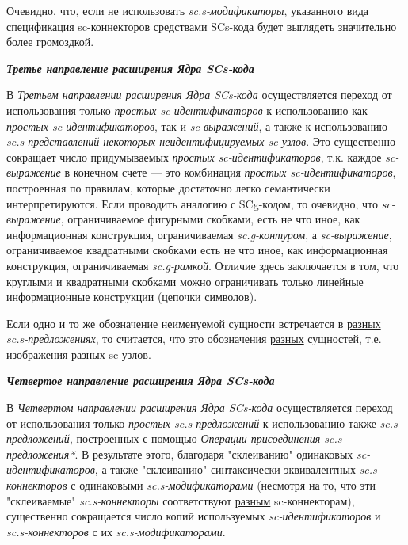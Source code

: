 Очевидно, что, если не использовать \textit{sc.s-модификаторы}, указанного вида спецификация sc-коннекторов средствами SCs-кода будет выглядеть значительно более громоздкой.

\textbf{\textit{Третье направление расширения Ядра SCs-кода}}

В \textit{Третьем направлении расширения Ядра SCs-кода} осуществляется переход от использования только \textit{простых sc-идентификаторов} к использованию как \textit{простых sc-идентификаторов}, так и \textit{sc-выражений}, а также к использованию \textit{sc.s-представлений некоторых неидентифицируемых sc-узлов}. Это существенно сокращает число придумываемых \textit{простых sc-идентификаторов}, т.к. каждое \textit{sc-выражение} в конечном счете — это комбинация \textit{простых sc-идентификаторов}, построенная по правилам, которые достаточно легко семантически интерпретируются. Если проводить аналогию с SCg-кодом, то очевидно, что \textit{\mbox{sc-выражение}}, ограничиваемое фигурными скобками, есть не что иное, как информационная конструкция, ограничиваемая \textit{sc.g-контуром}, а \textit{sc-выражение}, ограничиваемое квадратными скобками есть не что иное, как информационная конструкция, ограничиваемая \textit{sc.g-рамкой}. Отличие здесь заключается в том, что круглыми и квадратными скобками можно ограничивать только линейные информационные конструкции (цепочки символов).

\begin{SCn}
\end{SCn}

Если одно и то же обозначение неименуемой сущности встречается в \uline{разных} \textit{sc.s-предложениях}, то считается, что это обозначения \uline{разных} сущностей, т.е. изображения \uline{разных} sc-узлов.

\textbf{\textit{Четвертое направление расширения Ядра SCs-кода}}

В \textit{Четвертом направлении расширения Ядра SCs-кода} осуществляется переход от использования только \textit{простых sc.s-предложений} к использованию также \textit{sc.s-предложений}, построенных с помощью \textit{\mbox{Операции} присоединения sc.s-предложения*}. В результате этого, благодаря "склеиванию"{} одинаковых \textit{\mbox{sc-идентификаторов}}, а также "склеиванию"{} синтаксически эквивалентных \textit{\mbox{sc.s-коннекторов}} с одинаковыми \textit{\mbox{sc.s-модификаторами}} (несмотря на то, что эти "склеиваемые"{} \textit{sc.s-коннекторы} соответствуют \uline{разным} \mbox{sc-коннекторам}), существенно сокращается число копий используемых \textit{\mbox{sc-идентификаторов}} и \textit{\mbox{sc.s-коннекторов}} с их \textit{\mbox{sc.s-модификаторами}}.

